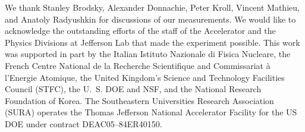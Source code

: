 \documentclass[aps,prc,twocolumn,floatfix,showpacs,preprintnumbers,amsmath,amssymb,superscriptaddress,linenumbers]{revtex4-1}
\begin{document}
We thank Stanley Brodsky, 
Alexander Donnachie, Peter Kroll, Vincent Mathieu, 
and Anatoly Radyushkin for discussions of our measurements. We 
would like to acknowledge the outstanding efforts of the staff of 
the Accelerator and the Physics Divisions at Jefferson Lab that 
made the experiment possible.  This work was supported in part by 
the Italian Istituto Nazionale di Fisica Nucleare, the French 
Centre National de la Recherche Scientifique and Commissariat \`a 
l'Energie Atomique, the United Kingdom's Science and Technology 
Facilities Council (STFC), the U.~S. DOE and NSF, and the National Research Foundation of Korea. The Southeastern Universities 
Research Association (SURA) operates the Thomas Jefferson National 
Accelerator Facility for the US DOE under contract DEAC05--84ER40150.
\end{document}
